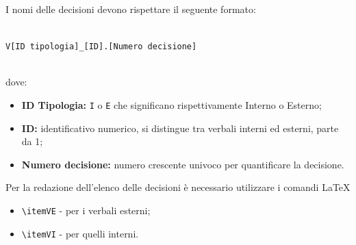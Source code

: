 	        I nomi delle decisioni devono rispettare il seguente formato:\\\\
            \centerline{\texttt{V[ID tipologia]\_[ID].[Numero decisione]}}\\
            dove:
            \begin{itemize}
            	\item \textbf{ID Tipologia:} \texttt{I} o \texttt{E} che significano rispettivamente Interno o Esterno;
            	 \item \textbf{ID:} identificativo numerico, si distingue tra verbali interni ed esterni, parte da 1;
            	 \item \textbf{Numero decisione:} numero crescente univoco per quantificare la decisione.
            \end{itemize}
			Per la redazione dell'elenco delle decisioni è necessario utilizzare i comandi \LaTeX
			\begin{itemize}
				\item \texttt{\textbackslash itemVE} - per i verbali esterni;
				\item \texttt{\textbackslash itemVI}  - per quelli interni.
			\end{itemize}
